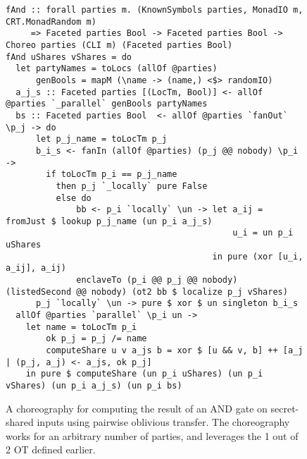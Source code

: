 \documentclass[sigplan,screen,review,anonymous]{acmart}
\begin{document}
\begin{figure*}
\begin{mdframed}
\begin{verbatim}
fAnd :: forall parties m. (KnownSymbols parties, MonadIO m, CRT.MonadRandom m)
     => Faceted parties Bool -> Faceted parties Bool -> Choreo parties (CLI m) (Faceted parties Bool)
fAnd uShares vShares = do
  let partyNames = toLocs (allOf @parties)
      genBools = mapM (\name -> (name,) <$> randomIO)
  a_j_s :: Faceted parties [(LocTm, Bool)] <- allOf @parties `_parallel` genBools partyNames
  bs :: Faceted parties Bool  <- allOf @parties `fanOut` \p_j -> do
      let p_j_name = toLocTm p_j
      b_i_s <- fanIn (allOf @parties) (p_j @@ nobody) \p_i ->
        if toLocTm p_i == p_j_name
          then p_j `_locally` pure False
          else do
              bb <- p_i `locally` \un -> let a_ij = fromJust $ lookup p_j_name (un p_i a_j_s)
                                             u_i = un p_i uShares
                                         in pure (xor [u_i, a_ij], a_ij)
              enclaveTo (p_i @@ p_j @@ nobody) (listedSecond @@ nobody) (ot2 bb $ localize p_j vShares)
      p_j `locally` \un -> pure $ xor $ un singleton b_i_s
  allOf @parties `parallel` \p_i un ->
    let name = toLocTm p_i
        ok p_j = p_j /= name
        computeShare u v a_js b = xor $ [u && v, b] ++ [a_j | (p_j, a_j) <- a_js, ok p_j]
    in pure $ computeShare (un p_i uShares) (un p_i vShares) (un p_i a_j_s) (un p_i bs)
\end{verbatim}
\caption{A choreography for computing the result of an AND gate on secret-shared inputs using pairwise oblivious transfer. The choreography works for an arbitrary number of parties, and leverages the 1 out of 2 OT defined earlier.}
\label{fig:fand}
\end{mdframed}
\end{figure*}
\end{document}
